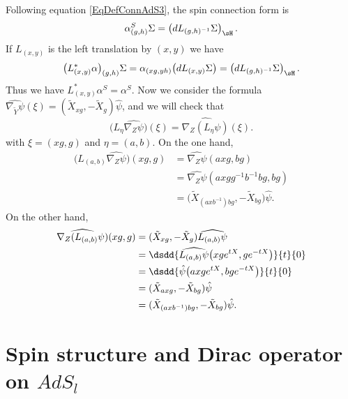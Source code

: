 Following equation \eqref{EqDefConnAdS3}, the spin connection form is
\[
	\alpha^{S}_{(g,h)}\Sigma=\left( dL_{(g,h)^{-1}}\Sigma \right)_{\sH}.
\]
If $L_{(x,y)}$ is the left translation by $(x,y)$ we have
\[
	\big( L^{*}_{(x,y)}\alpha \big)_{(g,h)}\Sigma=\alpha_{(xg,yh)}\big( dL_{(x,y)}\Sigma \big)
	=\left( dL_{(g,h)^{-1}}\Sigma \right)_{\sH}.
\]
Thus we have $L^*_{(x,y)}\alpha^{S}=\alpha^{S}$. Now we consider the formula $\widehat{\nabla_{\tilde Y}\psi}(\xi)=(\tilde X_{xg},-\tilde X_{g})\hat{\psi}$, and we will check that
\begin{equation}
	\big( L_{\eta}\widehat{\nabla_{Z}\psi} \big)(\xi)=\widehat{  \nabla_{Z}(L_{\eta}\psi)     }(\xi).
\end{equation}
with $\xi=(xg,g)$ and $\eta=(a,b)$. On the one hand,
\begin{align*}
	\big( L_{(a,b)}\widehat{\nabla_{Z}\psi} \big)(xg,g) & =\widehat{\nabla_{Z}\psi}(axg,bg)                              \\
	                                                    & =\widehat{\nabla_{Z}\psi}(axgg^{-1}b^{-1}bg,bg)                \\
	                                                    & =\big( \tilde X_{(axb^{-1})bg},-\tilde X_{bg} \big)\hat{\psi}.
\end{align*}
On the other hand,
\begin{align*}
	\widehat{  \nabla_{Z}(L_{(a,b)}\psi)   }(xg,g) & =(\tilde X_{xg},-\tilde X_{g})\widehat{L_{(a,b)}\psi}                  \\
	                                               & =\dsdd{ \widehat{L_{(a,b)}\psi}\big( xg e^{tX},g e^{-tX} \big) }{t}{0} \\
	                                               & =\dsdd{ \hat{\psi}\big( axg e^{tX},bg e^{-tX} \big) }{t}{0}            \\
	                                               & = (\tilde X_{axg},-\tilde X_{bg}) \hat{\psi}                           \\
	                                               & =( \tilde X_{(axb^{-1})bg},-\tilde X_{bg} )\hat{\psi}.
\end{align*}

\section{Spin structure and Dirac operator on \texorpdfstring{$AdS_{l}$}{AdSl}}\label{SecDirADs}

